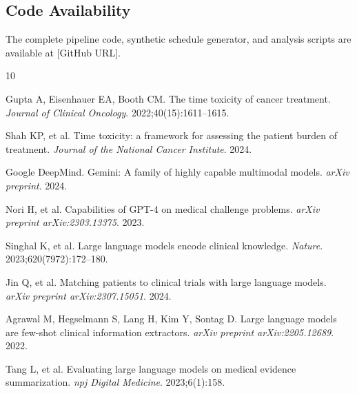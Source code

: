 \documentclass[11pt]{article}
\begin{document}
\subsection{Code Availability}

The complete pipeline code, synthetic schedule generator, and analysis scripts are available at [GitHub URL].


\begin{thebibliography}{10}

Gupta A, Eisenhauer EA, Booth CM.
The time toxicity of cancer treatment.
\textit{Journal of Clinical Oncology}. 2022;40(15):1611--1615.

Shah KP, et al.
Time toxicity: a framework for assessing the patient burden of treatment.
\textit{Journal of the National Cancer Institute}. 2024.

Google DeepMind.
Gemini: A family of highly capable multimodal models.
\textit{arXiv preprint}. 2024.

Nori H, et al.
Capabilities of GPT-4 on medical challenge problems.
\textit{arXiv preprint arXiv:2303.13375}. 2023.

Singhal K, et al.
Large language models encode clinical knowledge.
\textit{Nature}. 2023;620(7972):172--180.

Jin Q, et al.
Matching patients to clinical trials with large language models.
\textit{arXiv preprint arXiv:2307.15051}. 2024.

Agrawal M, Hegselmann S, Lang H, Kim Y, Sontag D.
Large language models are few-shot clinical information extractors.
\textit{arXiv preprint arXiv:2205.12689}. 2022.

Tang L, et al.
Evaluating large language models on medical evidence summarization.
\textit{npj Digital Medicine}. 2023;6(1):158.

\end{thebibliography}
\end{document}
